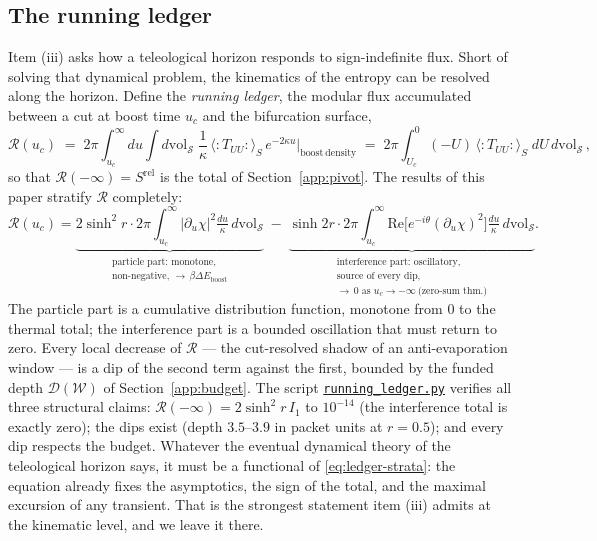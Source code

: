 \documentclass[11pt]{article}
\newcommand{\Srel}{S^{\mathrm{rel}}}
\begin{document}
\subsection{The running ledger}
\label{app:ledger}

Item (iii) asks how a teleological horizon responds to sign-indefinite flux. Short of solving that dynamical problem, the kinematics of the entropy can be resolved along the horizon. Define the \emph{running ledger}, the modular flux accumulated between a cut at boost time $u_c$ and the bifurcation surface,
\begin{equation}
\mathcal{R}(u_c)
\;=\;
2\pi \int_{u_c}^{\infty}\!\! du \int d\mathrm{vol}_{\mathcal{S}}\;
\frac{1}{\kappa}\,\big\langle{:}T_{UU}{:}\big\rangle_S\, e^{-2\kappa u}\Big|_{\mathrm{boost\ density}}
\;=\;
2\pi \int_{U_c}^{0} (-U)\,\big\langle{:}T_{UU}{:}\big\rangle_S\; dU\, d\mathrm{vol}_{\mathcal{S}}\,,
\label{eq:running}
\end{equation}
so that $\mathcal{R}(-\infty) = \Srel$ is the total of Section~\ref{app:pivot}. The results of this paper stratify $\mathcal{R}$ completely:
\begin{equation}
\mathcal{R}(u_c)
=
\underbrace{2\sinh^2\! r \cdot 2\pi\!\int_{u_c}^{\infty}\!\!\big|\partial_u\chi\big|^2 \tfrac{du}{\kappa}\, d\mathrm{vol}_{\mathcal{S}}}_{\substack{\text{particle part: monotone,}\\ \text{non-negative, } \to\, \beta\Delta E_{\mathrm{boost}}}}
\;-\;
\underbrace{\sinh 2r \cdot 2\pi\!\int_{u_c}^{\infty}\!\! \mathrm{Re}\big[e^{-i\theta}(\partial_u\chi)^2\big] \tfrac{du}{\kappa}\, d\mathrm{vol}_{\mathcal{S}}}_{\substack{\text{interference part: oscillatory,}\\ \text{source of every dip,}\\ \to\, 0 \text{ as } u_c \to -\infty \ \text{(zero-sum thm.)}}} .
\label{eq:ledger-strata}
\end{equation}
The particle part is a cumulative distribution function, monotone from $0$ to the thermal total; the interference part is a bounded oscillation that must return to zero. Every local decrease of $\mathcal{R}$ --- the cut-resolved shadow of an anti-evaporation window --- is a dip of the second term against the first, bounded by the funded depth $\mathcal{D}(\mathcal{W})$ of Section~\ref{app:budget}. The script \href{https://github.com/brentharts/NariaiRelativeEntropy/blob/main/running_ledger.py}{\texttt{running\_ledger.py}} verifies all three structural claims: $\mathcal{R}(-\infty) = 2\sinh^2\! r\, I_1$ to $10^{-14}$ (the interference total is exactly zero); the dips exist (depth $3.5$--$3.9$ in packet units at $r = 0.5$); and every dip respects the budget. Whatever the eventual dynamical theory of the teleological horizon says, it must be a functional of \eqref{eq:ledger-strata}: the equation already fixes the asymptotics, the sign of the total, and the maximal excursion of any transient. That is the strongest statement item (iii) admits at the kinematic level, and we leave it there.
\end{document}

